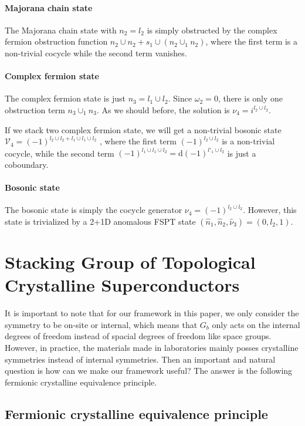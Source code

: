 \documentclass[%
 reprint,
 amsmath,amssymb,
 aps,
prb,
]{revtex4-2}
\begin{document}
\paragraph{Majorana chain state}
The Majorana chain state with $n_2 = l_2$ is simply obstructed by the complex fermion obstruction function $n_2 \cup n_2 + s_1 \cup (n_2 \cup_1 n_2)$, where the first term is a non-trivial cocycle while the second term vanishes.

\paragraph{Complex fermion state}
The complex fermion state is just $n_3 = l_1 \cup l_2$.
Since $\omega_2 = 0$, there is only one obstruction term $n_3 \cup_1 n_3$.
As we should before, the solution is $\nu_4 = i^{l_2 \cup l_2}$.

If we stack two complex fermion state, we will get a non-trivial bosonic state $\mathcal{V}_4 = (-1)^{l_2 \cup l_2 + l_1 \cup l_1 \cup l_2}$ , where the first term $(-1)^{l_2 \cup l_2}$ is a non-trivial cocycle, while the second term $(-1)^{l_1 \cup l_1 \cup l_2} = \mathrm{d} (-1)^{l'_1 \cup l_2}$ is just a coboundary.

\paragraph{Bosonic state} The bosonic state is simply the cocycle generator $\nu_4 = (-1)^{l_2 \cup l_2}$.
However, this state is trivialized by a 2+1D anomalous FSPT state $(\hat{n}_1, \hat{n}_2, \hat{\nu}_3) = (0, l_2, 1)$.


\section{Stacking Group of Topological Crystalline Superconductors}

It is important to note that for our framework in this paper, we only consider the symmetry to be on-site or internal, which means that $G_b$ only acts on the internal degrees of freedom instead of spacial degrees of freedom like space groups.
However, in practice, the materials made in laboratories mainly posses crystalline symmetries instead of internal symmetries.
Then an important and natural question is how can we make our framework useful?
The answer is the following fermionic crystalline equivalence principle.

\subsection{Fermionic crystalline equivalence principle}
\end{document}
